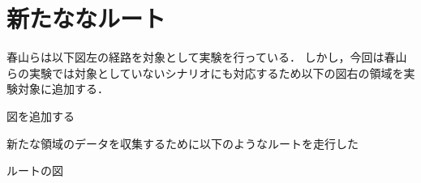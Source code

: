 \section{新たななルート}
春山らは以下図左の経路を対象として実験を行っている．
しかし，今回は春山らの実験では対象としていないシナリオにも対応するため以下の図右の領域を実験対象に追加する．

図を追加する



新たな領域のデータを収集するために以下のようなルートを走行した

ルートの図


